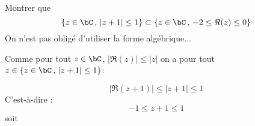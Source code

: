 



\begin{exercice}
Montrer que 
$$\{ z\in \bC\, , \, |z+1|\leq 1\} \subset \{ z \in \bC\, , \, -2\leq \Re(z)\leq0\}$$
\footnotesize{On n'est pas obligé d'utiliser la forme algébrique...}
\end{exercice}

\begin{correction}
 Comme pour tout $z\in \bC$, $|\Re(z)| \leq |z|$ on a pour tout $z\in \{ z\in \bC\, , \, |z+1|\leq 1\}$:
 
$$|\Re(z+1)| \leq |z+1|\leq 1$$
C'est-à-dire :
$$-1\leq z+1\leq 1$$
soit 
\begin{center}
\end{center}
\end{correction}